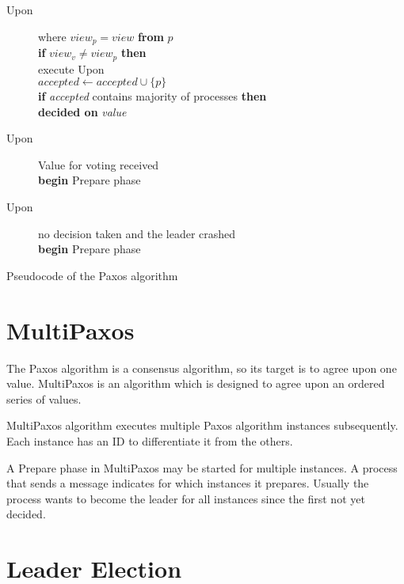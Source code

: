 \begin{table}
\begin{description}
 \vspace{-0.5em}
 \item[Upon]  where $\textit{view}_p = \textit{view}$ \textbf{from} $p$ \\
   \textbf{if} $\textit{view}_v \neq \textit{view}_p$ \textbf{then} \\
     \hspace*{\defaultParIndent} execute Upon  \\
   $\textit{accepted} \leftarrow \textit{accepted} \cup \{ p \} $ \\
   \textbf{if} \textit{accepted} contains majority of processes \textbf{then} \\
     \hspace*{\defaultParIndent} \textbf{decided on} \textit{value}

 \vspace{-0.5em}
 \item[Upon] Value for voting received \\
   \textbf{begin} Prepare phase

 \vspace{-0.5em}
 \item[Upon] no decision taken and the leader crashed \\
   \textbf{begin} Prepare phase

\end{description}
\caption{Pseudocode of the Paxos algorithm}
\label{table:paxosAlgorithm}
\end{table}

\section{MultiPaxos}

The Paxos algorithm is a consensus algorithm, so its target is to agree upon one value. MultiPaxos is an algorithm which is designed to agree upon an ordered series of values.

MultiPaxos algorithm executes multiple Paxos algorithm instances subsequently. Each instance has an ID to differentiate it from the others.

A Prepare phase in MultiPaxos may be started for multiple instances. A process that sends a \prepare message indicates for which instances it prepares. Usually the process wants to become the leader for all instances since the first not yet decided.

\section{Leader Election}
\label{sec:leader_election}

